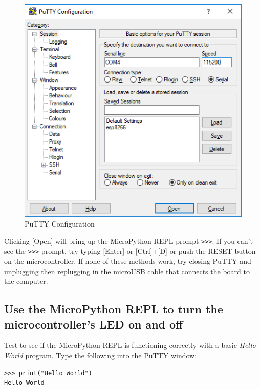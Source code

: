 \documentclass{book}
\makeatletter
\def\maxwidth{\ifdim\Gin@nat@width>\linewidth\linewidth
    \else\Gin@nat@width\fi}
\let\Oldincludegraphics\includegraphics
\renewcommand{\includegraphics}[1]{\Oldincludegraphics[width=.8\maxwidth]{#1}}
\makeatother
\begin{document}
\begin{figure}
\centering
\includegraphics{images/putty_config.PNG}
\caption{PuTTY Configuration}
\end{figure}

Clicking {[}Open{]} will bring up the MicroPython REPL prompt
\lstinline!>>>!. If you can't see the \lstinline!>>>! prompt, try typing
{[}Enter{]} or {[}Ctrl{]}+{[}D{]} or push the RESET button on the
microcontroller. If none of these methods work, try closing PuTTY and
unplugging then replugging in the microUSB cable that connects the board
to the computer.
    




    
        \subsection{Use the MicroPython REPL to turn the microcontroller's LED
on and
off}\label{use-the-micropython-repl-to-turn-the-microcontrollers-led-on-and-off}
    




    
        Test to see if the MicroPython REPL is functioning correctly with a
basic \emph{Hello World} program. Type the following into the PuTTY
window:

\begin{lstlisting}
>>> print("Hello World")
Hello World
\end{lstlisting}
\end{document}
